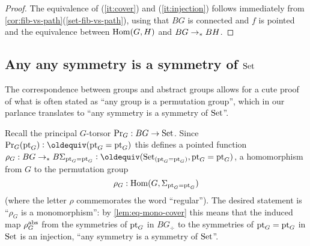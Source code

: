 {\begin{proof}
  The equivalence of (\ref{it:cover}) and (\ref{it:injection}) follows
immediately from \cref{cor:fib-vs-path}(\ref{set-fib-vs-path}), using
that $BG$ is connected and $f$ is pointed and the equivalence between $\mathrm{Hom}(G,H)$ and $BG\to_\ast BH$.
\end{proof}



\subsection{Any any symmetry is a symmetry of $\mathord{\mathrm{Set}}$}
\label{sec:groupssubperm}


The correspondence between groups and abstract groups allows for a cute proof of what is often stated as ``any group is a permutation group'', which in our parlance translates to ``any symmetry is a symmetry of $\mathord{\mathrm{Set}}$''.

Recall the principal $G$-torsor $\mathrm{Pr}_{{G}}:BG\to\mathord{\mathrm{Set}}$.
Since $\princ G(\pt_G)\defequi (\pt_G=\pt_G)$ this defines a pointed function $\rho_G:BG\to_* B\Sigma_{\pt_G=\pt_G}\defequi(\Set_{(\pt_G=\pt_G)},\pt_G=\pt_G)$, \ie a homomorphism from $G$ to the permutation group
$$\rho_G:\mathrm{Hom}(G,\Sigma_{\mathrm{pt}_G=\mathrm{pt}_G})$$
(where the letter $\rho$ commemorates the word ``regular'').
The desired statement is ``$\rho_G$ is a monomorphism'': by \cref{lem:eq-mono-cover} this means that the induced map $\rho_G^{\mathrm{abs}}$ from the symmetries of $\mathrm{pt}_G$ in $BG_\div$ to the symmetries of $\mathrm{pt}_G=\mathrm{pt}_G$ in $\mathord{\mathrm{Set}}$ is an injection, \ie ``any symmetry is a symmetry of $\mathord{\mathrm{Set}}$''.

}
